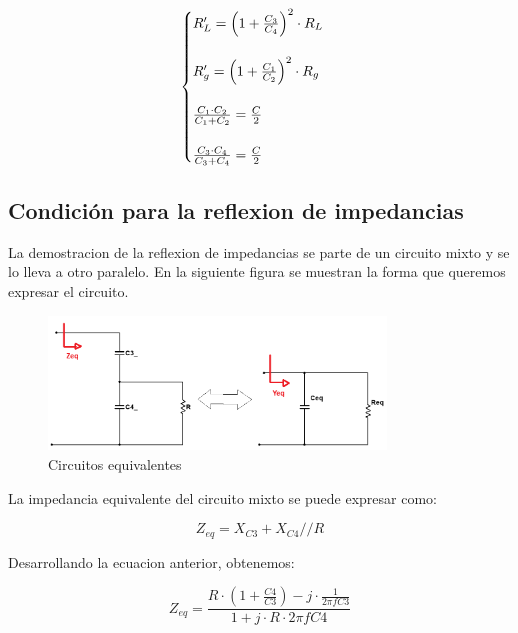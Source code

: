 \begin{equation}
    \begin{cases}
        R_L' = \left(1 + \frac{C_3}{C_4}\right)^2 \cdot R_L \vphantom{\frac{C_1 \cdot C_2}{C_1 + C_2}} \\
        \\
        R_g' = \left(1 + \frac{C_1}{C_2}\right)^2 \cdot R_g \vphantom{\frac{C_1 \cdot C_2}{C_1 + C_2}} \\
        \\
        \frac{C_1 \cdot C_2}{C_1 + C_2} = \frac{C}{2} \\
        \\
        \frac{C_3 \cdot C_4}{C_3 + C_4} = \frac{C}{2}
    \end{cases}
\end{equation}

\subsection{Condición para la reflexion de impedancias}

La demostracion de la reflexion de impedancias se parte de un circuito mixto y se lo lleva a otro paralelo. En la siguiente figura se muestran la forma que queremos expresar el circuito.

\begin{figure}[h]
    \centering
    \includegraphics[width=0.8\textwidth]{Imagenes/reflexion_impedancias.png}
    \caption{Circuitos equivalentes}
\end{figure}

La impedancia equivalente del circuito mixto se puede expresar como:

\begin{equation}
    Z_{eq} = X_{C3} + X_{C4} // R 
\end{equation}

Desarrollando la ecuacion anterior, obtenemos:

\begin{equation}
    Z_{eq} = \frac{R \cdot (1 + \frac{C4}{C3}) - j \cdot \frac{1}{2 \pi f C3}}{1 + j \cdot R \cdot 2 \pi f C4} 
\end{equation}

